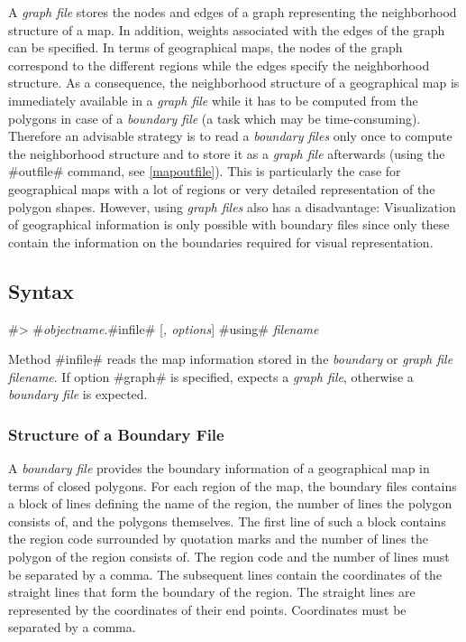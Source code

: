 A {\em graph file} stores the nodes and edges of a graph representing the neighborhood structure of a map. In addition,
weights associated with the edges of the graph can be specified. In terms of geographical maps, the nodes of the graph correspond to the different regions while the edges specify the neighborhood structure. As a consequence, the neighborhood structure of a geographical map is immediately available in a {\em graph file} while it has to be computed from the polygons in case of a {\em boundary file} (a task which may be time-consuming). Therefore an advisable strategy is to read a {\em boundary files} only once to compute the neighborhood structure and to store it as a {\em graph file} afterwards (using the #outfile# command, see \autoref{mapoutfile}). This is particularly the case for geographical maps with a lot of regions or very detailed representation of the polygon shapes. However, using {\em graph files} also has a disadvantage: Visualization of geographical information is only possible with boundary files since only these contain the information on the boundaries required for visual representation.

\subsection{Syntax}

#> #{\em objectname}.#infile# [{\em , options}] #using# {\em filename}

Method #infile# reads the map information stored in the {\em boundary} or {\em graph file} {\em filename}. If option #graph# is specified, \BayesX expects a {\em graph file}, otherwise a {\em boundary file} is expected.

\subsubsection*{Structure of a Boundary File}

A {\em boundary file} provides the boundary information of a geographical map in terms of closed polygons. For each region of the map, the boundary files contains a block of lines defining the name of the region, the number of lines the polygon consists of, and the polygons themselves. The first line of such a block contains the region code surrounded by quotation marks and the number of lines the polygon of the region consists of. The region code and the number of lines must be separated by a comma. The subsequent lines contain the coordinates of the straight lines that form the boundary of the region. The straight lines are represented by the coordinates of their end points. Coordinates must be separated by a comma.

